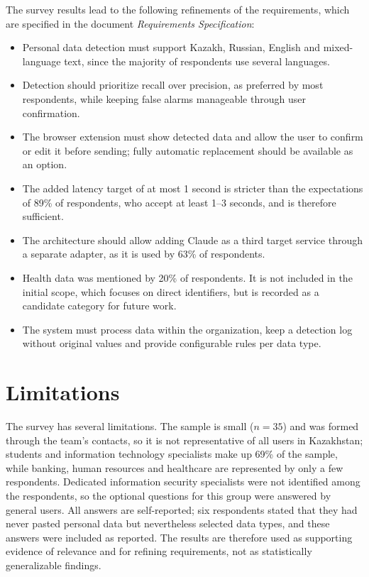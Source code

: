 \documentclass[12pt,a4paper]{article}
\begin{document}
The survey results lead to the following refinements of the requirements, which are specified in the document \emph{Requirements Specification}:
\begin{itemize}
\item Personal data detection must support Kazakh, Russian, English and mixed-language text, since the majority of respondents use several languages.
\item Detection should prioritize recall over precision, as preferred by most respondents, while keeping false alarms manageable through user confirmation.
\item The browser extension must show detected data and allow the user to confirm or edit it before sending; fully automatic replacement should be available as an option.
\item The added latency target of at most 1 second is stricter than the expectations of 89\% of respondents, who accept at least 1--3 seconds, and is therefore sufficient.
\item The architecture should allow adding Claude as a third target service through a separate adapter, as it is used by 63\% of respondents.
\item Health data was mentioned by 20\% of respondents. It is not included in the initial scope, which focuses on direct identifiers, but is recorded as a candidate category for future work.
\item The system must process data within the organization, keep a detection log without original values and provide configurable rules per data type.
\end{itemize}

\section{Limitations}

The survey has several limitations. The sample is small ($n=35$) and was formed through the team's contacts, so it is not representative of all users in Kazakhstan; students and information technology specialists make up 69\% of the sample, while banking, human resources and healthcare are represented by only a few respondents. Dedicated information security specialists were not identified among the respondents, so the optional questions for this group were answered by general users. All answers are self-reported; six respondents stated that they had never pasted personal data but nevertheless selected data types, and these answers were included as reported. The results are therefore used as supporting evidence of relevance and for refining requirements, not as statistically generalizable findings.
\end{document}
